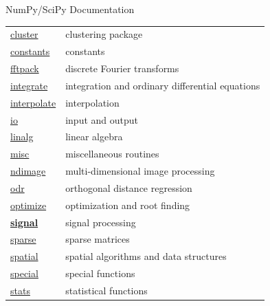 \documentclass[svgnames]{beamer}
\begin{document}
\begin{frame}{NumPy/SciPy Documentation}
 \begin{tabular}{ll}
  \url{cluster}     & clustering package\\
  \url{constants}   & constants \\
  \url{fftpack}     & discrete Fourier transforms \\
  \url{integrate}   & integration and ordinary differential equations\\
  \url{interpolate} & interpolation\\
  \url{io}          & input and output\\
  \url{linalg}      & linear algebra\\
  \url{misc}        & miscellaneous routines\\
  \url{ndimage}     & multi-dimensional image processing\\
  \url{odr}         & orthogonal distance regression\\
  \url{optimize}    & optimization and root finding\\
  \textbf<2>{\url{signal}}     & signal processing\\
  \url{sparse}      & sparse matrices\\
  \url{spatial}     & spatial algorithms and data structures\\
  \url{special}     & special functions\\
  \url{stats}       & statistical functions 
 \end{tabular}
\end{frame}
\end{document}
